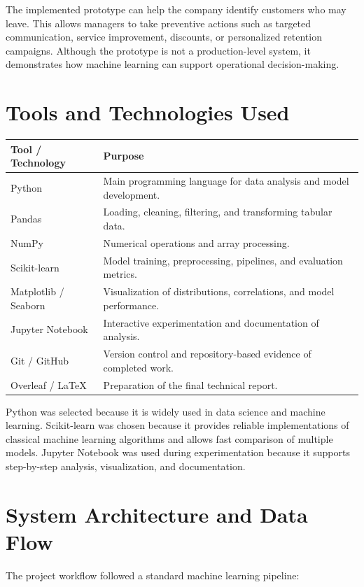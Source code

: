 \documentclass[12pt,a4paper]{article}
\begin{document}
The implemented prototype can help the company identify customers who may leave. This allows managers to take preventive actions such as targeted communication, service improvement, discounts, or personalized retention campaigns. Although the prototype is not a production-level system, it demonstrates how machine learning can support operational decision-making.

\section{Tools and Technologies Used}

\begin{longtable}{p{4cm}p{10cm}}
\toprule
\textbf{Tool / Technology} & \textbf{Purpose} \\
\midrule
Python & Main programming language for data analysis and model development. \\
Pandas & Loading, cleaning, filtering, and transforming tabular data. \\
NumPy & Numerical operations and array processing. \\
Scikit-learn & Model training, preprocessing, pipelines, and evaluation metrics. \\
Matplotlib / Seaborn & Visualization of distributions, correlations, and model performance. \\
Jupyter Notebook & Interactive experimentation and documentation of analysis. \\
Git / GitHub & Version control and repository-based evidence of completed work. \\
Overleaf / LaTeX & Preparation of the final technical report. \\
\bottomrule
\end{longtable}

Python was selected because it is widely used in data science and machine learning. Scikit-learn was chosen because it provides reliable implementations of classical machine learning algorithms and allows fast comparison of multiple models. Jupyter Notebook was used during experimentation because it supports step-by-step analysis, visualization, and documentation.

\section{System Architecture and Data Flow}

The project workflow followed a standard machine learning pipeline:
\end{document}

